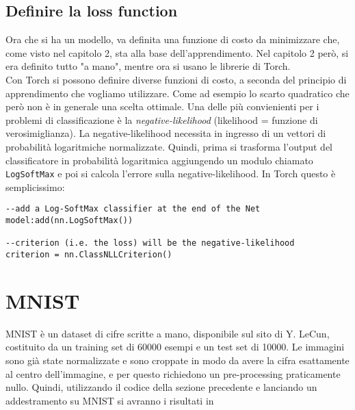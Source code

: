 \subsection{Definire la loss function}
Ora che si ha un modello, va definita una funzione di costo da minimizzare che, come visto nel capitolo 2, sta alla base dell’apprendimento. Nel capitolo 2 però, si era definito tutto "a mano", mentre ora si usano le librerie di Torch. \\Con Torch si possono definire diverse funzioni di costo, a seconda del principio di apprendimento che vogliamo utilizzare. Come ad esempio lo scarto quadratico che però non è in generale una scelta ottimale. Una delle più convienienti per i problemi di classificazione è la \emph{negative-likelihood} (likelihood = funzione di verosimiglianza). La negative-likelihood necessita in ingresso di un vettori di probabilità logaritmiche normalizzate. Quindi, prima si trasforma l’output del classificatore in probabilità logaritmica aggiungendo un modulo chiamato \texttt{LogSoftMax} e poi si calcola l'errore sulla negative-likelihood. In Torch questo è semplicissimo: 

\begin{lstlisting}[language={[5.2]Lua}]
--add a Log-SoftMax classifier at the end of the Net
model:add(nn.LogSoftMax())

--criterion (i.e. the loss) will be the negative-likelihood
criterion = nn.ClassNLLCriterion()
\end{lstlisting}

\section{}


\section{MNIST}
MNIST è un dataset di cifre scritte a mano, disponibile sul sito di Y. LeCun, costituito da un training set di 60000 esempi e un test set di 10000. Le immagini sono già state normalizzate e sono croppate in modo da avere la cifra esattamente al centro dell’immagine, e per questo richiedono un pre-processing praticamente nullo.
Quindi, utilizzando il codice della sezione precedente e lanciando un addestramento su MNIST si avranno i risultati in 

